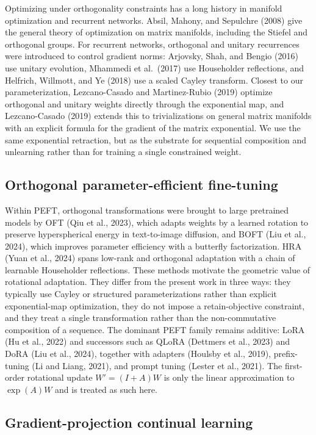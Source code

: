 \documentclass[
]{article}
\begin{document}
Optimizing under orthogonality constraints has a long history in manifold optimization and recurrent networks. Absil, Mahony, and Sepulchre (2008) give the general theory of optimization on matrix manifolds, including the Stiefel and orthogonal groups. For recurrent networks, orthogonal and unitary recurrences were introduced to control gradient norms: Arjovsky, Shah, and Bengio (2016) use unitary evolution, Mhammedi et al.~(2017) use Householder reflections, and Helfrich, Willmott, and Ye (2018) use a scaled Cayley transform. Closest to our parameterization, Lezcano-Casado and Martinez-Rubio (2019) optimize orthogonal and unitary weights directly through the exponential map, and Lezcano-Casado (2019) extends this to trivializations on general matrix manifolds with an explicit formula for the gradient of the matrix exponential. We use the same exponential retraction, but as the substrate for sequential composition and unlearning rather than for training a single constrained weight.

\subsection{Orthogonal parameter-efficient fine-tuning}\label{orthogonal-parameter-efficient-fine-tuning}

Within PEFT, orthogonal transformations were brought to large pretrained models by OFT (Qiu et al., 2023), which adapts weights by a learned rotation to preserve hyperspherical energy in text-to-image diffusion, and BOFT (Liu et al., 2024), which improves parameter efficiency with a butterfly factorization. HRA (Yuan et al., 2024) spans low-rank and orthogonal adaptation with a chain of learnable Householder reflections. These methods motivate the geometric value of rotational adaptation. They differ from the present work in three ways: they typically use Cayley or structured parameterizations rather than explicit exponential-map optimization, they do not impose a retain-objective constraint, and they treat a single transformation rather than the non-commutative composition of a sequence. The dominant PEFT family remains additive: LoRA (Hu et al., 2022) and successors such as QLoRA (Dettmers et al., 2023) and DoRA (Liu et al., 2024), together with adapters (Houlsby et al., 2019), prefix-tuning (Li and Liang, 2021), and prompt tuning (Lester et al., 2021). The first-order rotational update \(W'=(I+A)W\) is only the linear approximation to \(\exp(A)W\) and is treated as such here.

\subsection{Gradient-projection continual learning}\label{gradient-projection-continual-learning}
\end{document}
